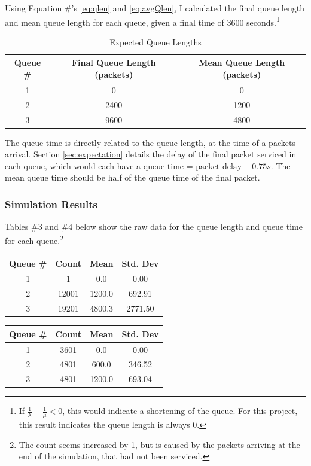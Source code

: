 \documentclass{article}
\begin{document}
Using Equation \#'s \ref{eq:qlen} and \ref{eq:avgQlen}, I calculated the final queue length and mean queue length for each queue, given a final time of 3600 seconds.\footnote{If $\frac{1}{\lambda} - \frac{1}{\mu} < 0$, this would indicate a shortening of the queue.  For this project, this result indicates the queue length is always 0.}

\begin{table}[h!]
	\centering
	\begin{tabular}{|c|c|c|} \hline
	\textbf{Queue \#} & \textbf{Final Queue Length (packets)} & \textbf{Mean Queue Length (packets)} \\ \hline
	1 & 0 & 0 \\ \hline
	2 & 2400 & 1200 \\ \hline
	3 & 9600 & 4800 \\ \hline
	\end{tabular}
	\label{tab:expect_qlen}
	\caption{Expected Queue Lengths}
\end{table}

The queue time is directly related to the queue length, at the time of a packets arrival.
Section \ref{sec:expectation} details the delay of the final packet serviced in each queue, which would each have a queue time = $\text{packet delay} - 0.75s$.
The mean queue time should be half of the queue time of the final packet.

\subsubsection*{Simulation Results}
Tables \#3 and \#4 below show the raw data for the queue length and queue time for each queue.\footnote{The count seems increased by 1, but is caused by the packets arriving at the end of the simulation, that had not been serviced.}
\vspace{.25cm}

\begin{minipage}{0.5\textwidth}
	\centering
	\begin{tabular}{|c|c|c|c|} \hline
		\textbf{Queue \#} & \textbf{Count} & \textbf{Mean} & \textbf{Std. Dev} \\ \hline
		1 & 1 & 0.0 & 0.00 \\ \hline
		2 & 12001 & 1200.0 & 692.91 \\ \hline
		3 & 19201 & 4800.3 & 2771.50 \\ \hline
	\end{tabular}
	\label{qlen}
\end{minipage}  
\begin{minipage}{0.5\textwidth}
	\centering
	\begin{tabular}{|c|c|c|c|} \hline
		\textbf{Queue \#} & \textbf{Count} & \textbf{Mean} & \textbf{Std. Dev} \\ \hline
		1 & 3601 & 0.0 & 0.00 \\ \hline
		2 & 4801 & 600.0 & 346.52 \\ \hline
		3 & 4801 & 1200.0 & 693.04 \\ \hline
	\end{tabular}
	\label{qTime}
\end{minipage}
\vspace{.25cm}
\end{document}

